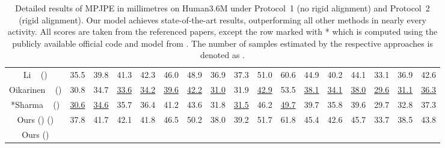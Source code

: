 \documentclass[10pt,twocolumn,letterpaper]{article}
\begin{document}
\begin{table*}
\begin{center}
{\begin{tabular}{  c  c  c  c  c  c  c  c  c  c  c  c  c  c  c  c  c}
				Li \etal~\cite{Li_2019_CVPR} () & {35.5} & {39.8} & {41.3} & {42.3} & {46.0} & {48.9} & {36.9} & {37.3} & {51.0} & {60.6} & {44.9} & {40.2} & {44.1} & {33.1} & {36.9} & {42.6}\\    
				Oikarinen \etal~\cite{oikarinen2020graphmdn} () & 30.8 & 34.7 & \underline{33.6} & \underline{34.2} & \underline{39.6} & \underline{42.2} & \underline{31.0} & 31.9 & \underline{42.9} & 53.5 & \underline{38.1} & \underline{34.1} & \underline{38.0} & \underline{29.6} & \underline{31.1}& \underline{36.3}\\
				*Sharma \etal~\cite{Sharma_2019_ICCV} () & \underline{30.6} & \underline{34.6} & 35.7 & 36.4 & 41.2 & 43.6 & 31.8 & \underline{31.5} & 46.2 & \underline{49.7} & 39.7 & 35.8 & 39.6 & 29.7& 32.8 & 37.3\\ \hdashline
				Ours () () & 37.8 & 41.7 & 42.1 & 41.8 & 46.5 & 50.2 & 38.0 & 39.2 & 51.7 & 61.8 & 45.4 & 42.6 & 45.7 & 33.7 & 38.5 & 43.8\\   
				Ours () &  &  &  &  &  &  &  &  &  &  &  &  &  &  &  & \\ \hline
			\end{tabular}}
		\caption{Detailed results of MPJPE in millimetres on Human3.6M under Protocol~1 (no rigid alignment) and Protocol~2 (rigid alignment).
			Our model achieves state-of-the-art results, outperforming all other methods in nearly every activity.
			All scores are taken from the referenced papers, except the row marked with * which is computed using the publicly available official code and model from \cite{Sharma_2019_ICCV}. The number of samples estimated by the respective approaches is denoted as .}
		\vspace{-2.0em}
		\label{table:protocolI}
	\end{center}
\end{table*}
\end{document}
